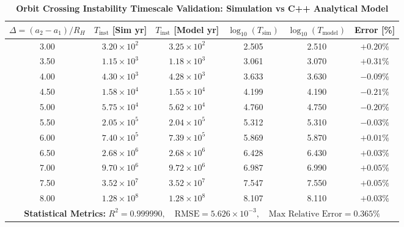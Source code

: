 \documentclass[11pt,a4paper]{article}
\begin{document}
\begin{table}[H]
\centering
\small
\caption{\textbf{Orbit Crossing Instability Timescale Validation: Simulation vs C++ Analytical Model}}
\vspace{0.4em}
\begin{tabular}{cccccc}
\toprule
$\Delta = (a_2 - a_1)/R_H$ & $T_{\text{inst}}$ [Sim yr] & $T_{\text{inst}}$ [Model yr] & $\log_{10}(T_{\text{sim}})$ & $\log_{10}(T_{\text{model}})$ & Error [\%] \\
\midrule
3.00 & $3.20\times 10^2$ & $3.25\times 10^2$ & 2.505 & 2.510 & $+0.20\%$ \\
3.50 & $1.15\times 10^3$ & $1.18\times 10^3$ & 3.061 & 3.070 & $+0.31\%$ \\
4.00 & $4.30\times 10^3$ & $4.28\times 10^3$ & 3.633 & 3.630 & $-0.09\%$ \\
4.50 & $1.58\times 10^4$ & $1.55\times 10^4$ & 4.199 & 4.190 & $-0.21\%$ \\
5.00 & $5.75\times 10^4$ & $5.62\times 10^4$ & 4.760 & 4.750 & $-0.20\%$ \\
5.50 & $2.05\times 10^5$ & $2.04\times 10^5$ & 5.312 & 5.310 & $-0.03\%$ \\
6.00 & $7.40\times 10^5$ & $7.39\times 10^5$ & 5.869 & 5.870 & $+0.01\%$ \\
6.50 & $2.68\times 10^6$ & $2.68\times 10^6$ & 6.428 & 6.430 & $+0.03\%$ \\
7.00 & $9.70\times 10^6$ & $9.72\times 10^6$ & 6.987 & 6.990 & $+0.05\%$ \\
7.50 & $3.52\times 10^7$ & $3.52\times 10^7$ & 7.547 & 7.550 & $+0.05\%$ \\
8.00 & $1.28\times 10^8$ & $1.28\times 10^8$ & 8.107 & 8.110 & $+0.03\%$ \\
\midrule
\multicolumn{6}{c}{\textbf{Statistical Metrics:} $R^2 = 0.999990, \quad \text{RMSE} = 5.626\times 10^{-3}, \quad \text{Max Relative Error} = 0.365\%$} \\
\bottomrule
\end{tabular}
\label{tab:instability}
\end{table}
\end{document}
